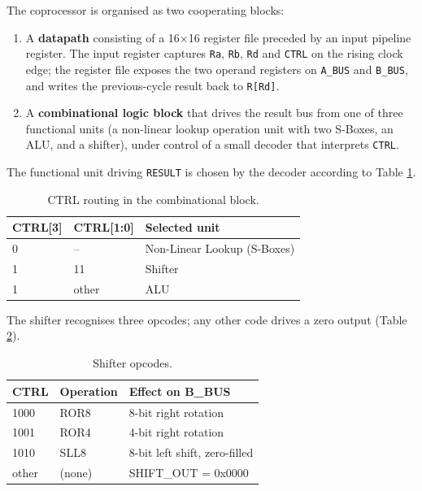 \documentclass[11pt,a4paper]{article}
\begin{document}
The coprocessor is organised as two cooperating blocks:

\begin{enumerate}[leftmargin=*]
  \item A \textbf{datapath} consisting of a 16$\times$16 register file
        preceded by an input pipeline register. The input register
        captures \texttt{Ra}, \texttt{Rb}, \texttt{Rd} and
        \texttt{CTRL} on the rising clock edge; the register file
        exposes the two operand registers on \texttt{A\_BUS} and
        \texttt{B\_BUS}, and writes the previous-cycle result back to
        \texttt{R[Rd]}.
  \item A \textbf{combinational logic block} that drives the result
        bus from one of three functional units (a non-linear
        lookup operation unit with two S-Boxes, an ALU, and a
        shifter), under control of a small decoder that interprets
        \texttt{CTRL}.
\end{enumerate}

The functional unit driving \texttt{RESULT} is chosen by the decoder
according to Table \ref{tab:ctrl-routing}.

\begin{table}[H]
  \centering
  \caption{CTRL routing in the combinational block.}
  \label{tab:ctrl-routing}
  \begin{tabular}{@{}lll@{}}
    \toprule
    \textbf{CTRL[3]} & \textbf{CTRL[1:0]} & \textbf{Selected unit} \\
    \midrule
    0 & --     & Non-Linear Lookup (S-Boxes) \\
    1 & 11     & Shifter                     \\
    1 & other  & ALU                         \\
    \bottomrule
  \end{tabular}
\end{table}

The shifter recognises three opcodes; any other code drives a zero
output (Table \ref{tab:shifter-ops}).

\begin{table}[H]
  \centering
  \caption{Shifter opcodes.}
  \label{tab:shifter-ops}
  \begin{tabular}{@{}lll@{}}
    \toprule
    \textbf{CTRL} & \textbf{Operation} & \textbf{Effect on B\_BUS} \\
    \midrule
    1000  & ROR8 & 8-bit right rotation \\
    1001  & ROR4 & 4-bit right rotation \\
    1010  & SLL8 & 8-bit left shift, zero-filled \\
    other & (none) & SHIFT\_OUT = 0x0000 \\
    \bottomrule
  \end{tabular}
\end{table}
\end{document}
